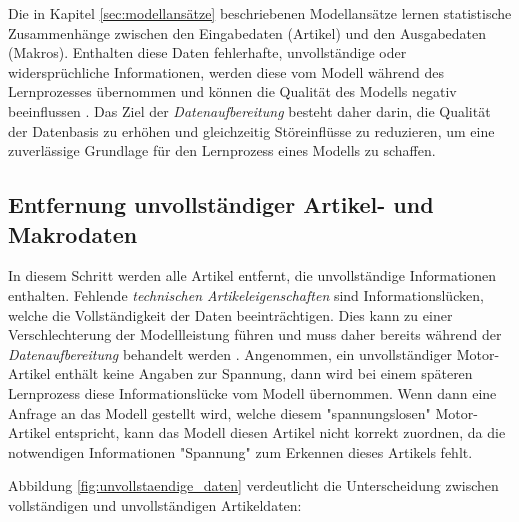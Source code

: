 Die in Kapitel \ref{sec:modellansätze} beschriebenen Modellansätze lernen statistische Zusammenhänge zwischen den Eingabedaten (Artikel) und den Ausgabedaten (Makros).
Enthalten diese Daten fehlerhafte, unvollständige oder widersprüchliche Informationen, 
werden diese vom Modell während des Lernprozesses übernommen und können die Qualität des Modells negativ beeinflussen \cite{emmanuel2021missing,hastie2009elements}. 
Das Ziel der \textit{Datenaufbereitung} besteht daher darin, die Qualität der Datenbasis zu erhöhen und gleichzeitig Störeinflüsse zu reduzieren, um eine zuverlässige Grundlage für den Lernprozess eines Modells zu schaffen.

\subsection{Entfernung unvollständiger Artikel- und Makrodaten}
\label{sec:entfernen_unvollständiger_artikel_und_makrodaten}

In diesem Schritt werden alle Artikel entfernt, die unvollständige Informationen enthalten. 
Fehlende \textit{technischen Artikeleigenschaften} sind Informationslücken, welche die Vollständigkeit der Daten beeinträchtigen. Dies kann zu einer Verschlechterung der Modellleistung führen und muss daher bereits während der \textit{Datenaufbereitung} behandelt werden \cite{emmanuel2021missing}.
Angenommen, ein unvollständiger Motor-Artikel enthält keine Angaben zur Spannung, dann wird bei einem späteren Lernprozess diese Informationslücke vom Modell übernommen. Wenn dann eine Anfrage an das Modell gestellt wird, welche diesem "spannungslosen" Motor-Artikel entspricht, kann das Modell diesen Artikel nicht korrekt zuordnen, 
da die notwendigen Informationen "Spannung" zum Erkennen dieses Artikels fehlt.

Abbildung \ref{fig:unvollstaendige_daten} verdeutlicht die Unterscheidung zwischen vollständigen und unvollständigen Artikeldaten:

